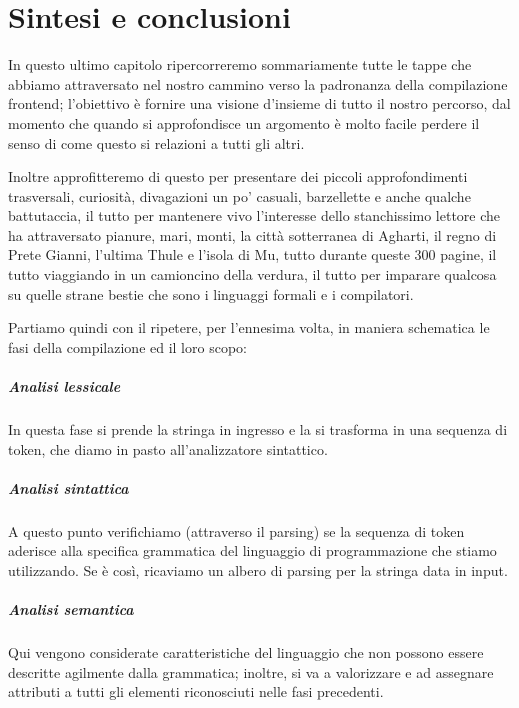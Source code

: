 \documentclass[class=book, crop=false, oneside, 12pt]{standalone}
\begin{document}
\chapter{Sintesi e conclusioni}
In questo ultimo capitolo ripercorreremo sommariamente tutte le tappe che abbiamo attraversato nel nostro cammino verso la padronanza della compilazione frontend; l'obiettivo è fornire una visione d'insieme di tutto il nostro percorso, dal momento che quando si approfondisce un argomento è molto facile perdere il senso di come questo si relazioni a tutti gli altri. 

Inoltre approfitteremo di questo per presentare dei piccoli approfondimenti trasversali, curiosità, divagazioni un po' casuali, barzellette e anche qualche battutaccia, il tutto per mantenere vivo l'interesse dello stanchissimo lettore che ha attraversato pianure, mari, monti, la città sotterranea di Agharti, il regno di Prete Gianni, l'ultima Thule e l'isola di Mu, tutto durante queste 300 pagine, il tutto viaggiando in un camioncino della verdura, il tutto per imparare qualcosa su quelle strane bestie che sono i linguaggi formali e i compilatori.


Partiamo quindi con il ripetere, per l'ennesima volta, in maniera schematica le fasi della compilazione ed il loro scopo:
\paragraph{Analisi lessicale} In questa fase si prende la stringa in ingresso e la si trasforma in una sequenza di token, che diamo in pasto all'analizzatore sintattico.

\paragraph{Analisi sintattica} A questo punto verifichiamo (attraverso il parsing) se la sequenza di token aderisce alla specifica grammatica del linguaggio di programmazione che stiamo utilizzando. Se è così, ricaviamo un albero di parsing per la stringa data in input. 

\paragraph{Analisi semantica} Qui vengono considerate caratteristiche del linguaggio che non possono essere descritte agilmente dalla grammatica; inoltre, si va a valorizzare e ad assegnare attributi a tutti gli elementi riconosciuti nelle fasi precedenti.
	
\end{document}
